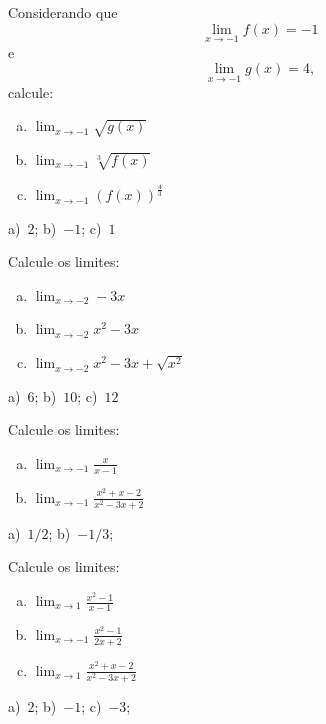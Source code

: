\begin{exer}
  Considerando que
  \begin{equation}
    \lim_{x\to -1} f(x) = -1
  \end{equation}
  e
  \begin{equation}
    \lim_{x\to -1} g(x) = 4,
  \end{equation}
  calcule:
  \begin{enumerate}[a)]
  \item $\displaystyle\lim_{x\to -1} \sqrt{g(x)}$
  \item $\displaystyle\lim_{x\to -1} \sqrt[3]{f(x)}$
  \item $\displaystyle\lim_{x\to -1} (f(x))^{\frac{4}{3}}$
  \end{enumerate}
\end{exer}
\begin{resp}
  a)~$2$; b)~$-1$; c)~$1$
\end{resp}

\begin{exer}
  Calcule os limites:
  \begin{enumerate}[a)]
  \item $\displaystyle\lim_{x\to -2} -3x$\\
  \item $\displaystyle\lim_{x\to -2} x^2-3x$\\    
  \item $\displaystyle\lim_{x\to -2} x^2-3x+\sqrt{x^2}$\\    
  \end{enumerate}
\end{exer}
\begin{resp}
  a)~$6$; b)~$10$; c)~$12$
\end{resp}

\begin{exer}
  Calcule os limites:
  \begin{enumerate}[a)]
  \item $\displaystyle\lim_{x\to -1} \frac{x}{x-1}$\\
  \item $\displaystyle\lim_{x\to -1} \frac{x^2+x-2}{x^2-3x+2}$\\    
  \end{enumerate}
\end{exer}
\begin{resp}
  a)~$1/2$; b)~$-1/3$;
\end{resp}

\begin{exer}
  Calcule os limites:
  \begin{enumerate}[a)]
  \item $\displaystyle\lim_{x\to 1} \frac{x^2-1}{x-1}$\\
  \item $\displaystyle\lim_{x\to -1} \frac{x^2-1}{2x+2}$\\
  \item $\displaystyle\lim_{x\to 1} \frac{x^2+x-2}{x^2-3x+2}$\\    
  \end{enumerate}
\end{exer}
\begin{resp}
  a)~$2$; b)~$-1$; c)~$-3$;
\end{resp}

